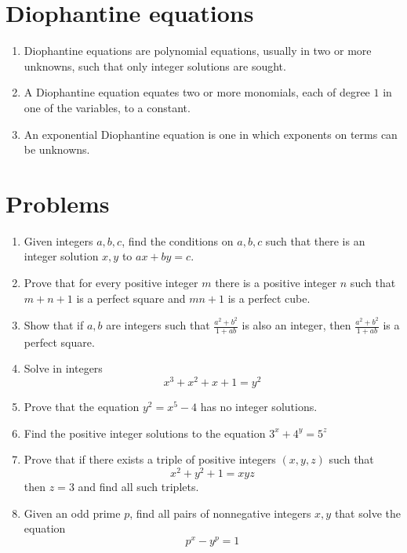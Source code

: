 \documentclass{article}
\begin{document}
	
\section*{Diophantine equations}
\begin{enumerate}
	\item 
	Diophantine equations are polynomial equations, usually in two or more unknowns, such that only integer solutions are sought.
	\item 
	A Diophantine equation equates two or more monomials, each of degree $1$ in one of the variables, to a constant.
	\item 
	An exponential Diophantine equation is one in which exponents on terms can be unknowns. 
\end{enumerate}
\section*{Problems}
\begin{enumerate}
	\item 
	Given integers $a,b,c$, find the conditions on $a,b,c$ such that there is an integer solution $x,y$ to
	$ax+by=c$.
	\item %
	Prove that for every positive integer $m$ there is a positive integer $n$ such that $m+n+1$ is a perfect square and $mn+1$ is a perfect cube.
	
	\item %
	Show that if $a,b$ are integers such that $\tfrac{a^2+b^2}{1+ab}$ is also an integer, then $\tfrac{a^2+b^2}{1+ab}$ is a perfect square.
	
	\item %
	Solve in integers
	$$x^3 +x^2 + x + 1 = y^2$$
	
	\item %
	Prove that the equation $y^2=x^5-4$ has no integer solutions.
	\item %
	Find the positive integer solutions to the equation
	$3^x+4^y=5^z$	
	
	\item %
	Prove that if there exists a triple of positive integers $(x,y,z)$ such that 
	$$x^2 + y^2+1 = xyz$$
	then $z=3$ and find all such triplets.
	
	\item %
	Given an odd prime $p$, find all pairs of nonnegative integers $x,y$ that solve the equation
	$$p^x - y^p =1$$
	
\end{enumerate}
\end{document}
